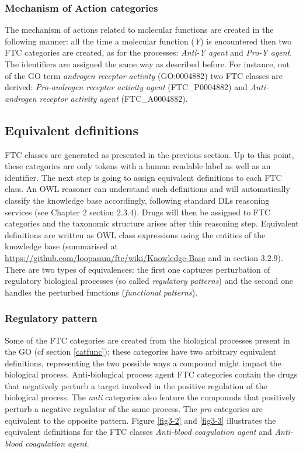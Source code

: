 \subsubsection{Mechanism of Action categories}
The mechanism of actions related to molecular functions are created in the following manner: all the time a molecular function (\emph{Y}) is encountered then two FTC categories are created, as for the processes: \emph{Anti-Y agent} and \emph{Pro-Y agent}. The identifiers are assigned the same way as described before. For instance, out of the GO term \emph{androgen receptor activity} (GO:0004882) two FTC classes are derived: \emph{Pro-androgen receptor activity agent} (FTC\_P0004882) and \emph{Anti-androgen receptor activity agent} (FTC\_A0004882).

\subsection{Equivalent definitions}
FTC classes are generated as presented in the previous section. Up to this point, these categories are only tokens with a human readable label as well as an identifier. The next step is going to assign equivalent definitions to each FTC class. An OWL reasoner can understand such definitions and will automatically classify the knowledge base accordingly, following standard DLs reasoning services (see Chapter 2 section 2.3.4).
Drugs will then be assigned to FTC categories and the taxonomic structure arises after this reasoning step. Equivalent definitions are written as OWL class expressions using the entities of the knowledge base (summarised at \url{https://github.com/loopasam/ftc/wiki/Knowledge-Base} and in section 3.2.9). There are two types of equivalences: the first one captures perturbation of regulatory biological processes (so called \emph{regulatory patterns}) and the second one handles the perturbed functions (\emph{functional patterns}).

\subsubsection{Regulatory pattern}
Some of the FTC categories are created from the biological processes present in the GO (cf section \ref{catfunc}); these categories have two arbitrary equivalent definitions, representing the two possible ways a compound might impact the biological process. Anti-biological process agent FTC categories contain the drugs that negatively perturb a target involved in the positive regulation of the biological process. The \emph{anti} categories also feature the compounds that positively perturb a negative regulator of the same process. The \emph{pro} categories are equivalent to the opposite pattern. Figure \ref{fig3-2} and \ref{fig3-3} illustrates the equivalent definitions for the FTC classes \emph{Anti-blood coagulation agent} and \emph{Anti-blood coagulation agent}.

